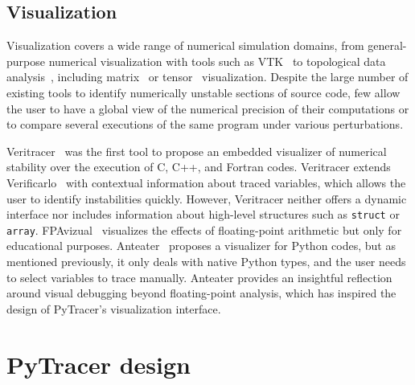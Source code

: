 \documentclass[11pt]{article}
\newcommand{\pytracer}[0]{PyTracer\xspace}
\begin{document}


\subsection{Visualization}

Visualization covers a wide range of numerical simulation domains, from general-purpose numerical visualization with tools
such as VTK~\cite{schroeder2000visualizing} to topological data analysis~\cite{tierny2018topological}, including matrix~\cite{wu2008matrix} or tensor~\cite{kindlmann2006diffusion} visualization.
Despite the large number of existing tools to identify numerically unstable sections of source code, few allow the user to have a global view of the numerical precision of their computations or to compare several executions of the same program under various perturbations.

Veritracer~\cite{chatelain2018veritracer} was the first tool to propose an embedded visualizer of numerical stability over the execution of C, C++, and Fortran codes. Veritracer extends Verificarlo~\cite{verificarlo} with contextual information about traced variables, which allows the user to identify instabilities quickly.
However, Veritracer neither offers a dynamic interface nor includes information about high-level structures such as \texttt{struct} or \texttt{array}.
FPAvizual~\cite{gu2014fpavisual} visualizes the effects of floating-point arithmetic but only for educational purposes.
Anteater~\cite{faust2019anteater} proposes a visualizer for Python codes, but as mentioned previously, it only deals with native Python types, and the user needs to select variables to trace manually. Anteater provides an insightful reflection 
around visual debugging beyond floating-point analysis, which has inspired the design of \pytracer's visualization interface.



\section{\pytracer design}
\end{document}
